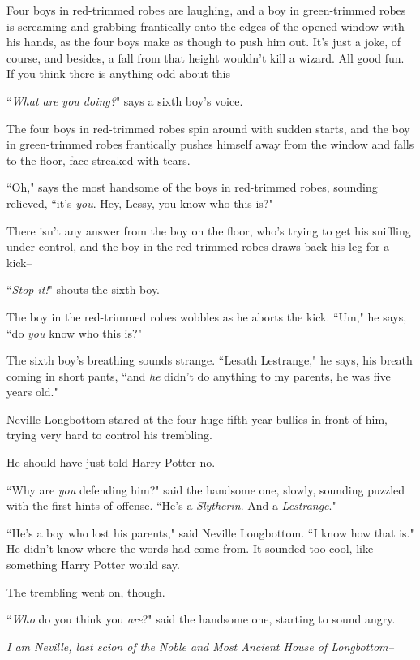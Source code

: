 Four boys in red-trimmed robes are laughing, and a boy in green-trimmed robes is screaming and grabbing frantically onto the edges of the opened window with his hands, as the four boys make as though to push him out. It's just a joke, of course, and besides, a fall from that height wouldn't kill a wizard. All good fun. If you think there is anything odd about this\---

``\emph{What are you doing?}" says a sixth boy's voice.

The four boys in red-trimmed robes spin around with sudden starts, and the boy in green-trimmed robes frantically pushes himself away from the window and falls to the floor, face streaked with tears.

``Oh," says the most handsome of the boys in red-trimmed robes, sounding relieved, ``it's \emph{you}. Hey, Lessy, you know who this is?"

There isn't any answer from the boy on the floor, who's trying to get his sniffling under control, and the boy in the red-trimmed robes draws back his leg for a kick\---

``\emph{Stop it!}" shouts the sixth boy.

The boy in the red-trimmed robes wobbles as he aborts the kick. ``Um," he says, ``do \emph{you} know who this is?"

The sixth boy's breathing sounds strange. ``Lesath Lestrange," he says, his breath coming in short pants, ``and \emph{he} didn't do anything to my parents, he was five years old."

\later

Neville Longbottom stared at the four huge fifth-year bullies in front of him, trying very hard to control his trembling.

He should have just told Harry Potter no.

``Why are \emph{you} defending him?" said the handsome one, slowly, sounding puzzled with the first hints of offense. ``He's a \emph{Slytherin}. And a \emph{Lestrange}."

``He's a boy who lost his parents," said Neville Longbottom. ``I know how that is." He didn't know where the words had come from. It sounded too cool, like something Harry Potter would say.

The trembling went on, though.

``\emph{Who} do you think you \emph{are}?" said the handsome one, starting to sound angry.

\emph{I am Neville, last scion of the Noble and Most Ancient House of Longbottom\---}

